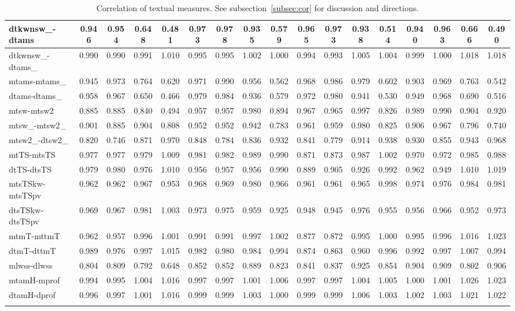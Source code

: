 \documentclass[%
 aip,
 jmp,%
 amsmath,amssymb,
 reprint,%
]{revtex4-1}
\begin{document}
\begin{longtable*}{|p{2cm}||c|c|c|c|| c|c|c|c|| c|c|c|c|| c|c|c|c|}
dtkwnsw\_-dtams & 0.946 & 0.954 & 0.648 & 0.481 & 0.973 & 0.978 & 0.935 & 0.579 & 0.965 & 0.973 & 0.938 & 0.514 & 0.940 & 0.963 & 0.666 & 0.490 \\ \hline
dtkwnsw\_-dtams\_ & 0.990 & 0.990 & 0.991 & 1.010 & 0.995 & 0.995 & 1.002 & 1.000 & 0.994 & 0.993 & 1.005 & 1.004 & 0.999 & 1.000 & 1.018 & 1.018 \\ \hline
mtams-mtams\_ & 0.945 & 0.973 & 0.764 & 0.620 & 0.971 & 0.990 & 0.956 & 0.562 & 0.968 & 0.986 & 0.979 & 0.602 & 0.903 & 0.969 & 0.763 & 0.542 \\ \hline
dtams-dtams\_ & 0.958 & 0.967 & 0.650 & 0.466 & 0.979 & 0.984 & 0.936 & 0.579 & 0.972 & 0.980 & 0.941 & 0.530 & 0.949 & 0.968 & 0.690 & 0.516 \\ \hline
mtsw-mtsw2 & 0.885 & 0.885 & 0.840 & 0.494 & 0.957 & 0.957 & 0.980 & 0.894 & 0.967 & 0.965 & 0.997 & 0.826 & 0.989 & 0.990 & 0.904 & 0.920 \\ \hline
mtsw\_-mtsw2\_ & 0.901 & 0.885 & 0.904 & 0.808 & 0.952 & 0.952 & 0.942 & 0.783 & 0.961 & 0.959 & 0.980 & 0.825 & 0.906 & 0.967 & 0.796 & 0.740 \\ \hline
mtsw2\_-dtsw2\_ & 0.820 & 0.746 & 0.871 & 0.970 & 0.848 & 0.784 & 0.836 & 0.932 & 0.841 & 0.779 & 0.914 & 0.938 & 0.930 & 0.855 & 0.943 & 0.968 \\ \hline
mtTS-mtsTS & 0.977 & 0.977 & 0.979 & 1.009 & 0.981 & 0.982 & 0.989 & 0.990 & 0.871 & 0.873 & 0.987 & 1.002 & 0.970 & 0.972 & 0.985 & 0.988 \\ \hline
dtTS-dtsTS & 0.979 & 0.980 & 0.976 & 1.010 & 0.956 & 0.957 & 0.956 & 0.990 & 0.889 & 0.905 & 0.926 & 0.992 & 0.962 & 0.949 & 1.010 & 1.019 \\ \hline
mtsTSkw-mtsTSpv & 0.962 & 0.962 & 0.967 & 0.953 & 0.968 & 0.969 & 0.980 & 0.966 & 0.961 & 0.961 & 0.965 & 0.998 & 0.974 & 0.976 & 0.984 & 0.981 \\ \hline
dtsTSkw-dtsTSpv & 0.969 & 0.967 & 0.981 & 1.003 & 0.973 & 0.975 & 0.959 & 0.925 & 0.948 & 0.945 & 0.976 & 0.955 & 0.956 & 0.966 & 0.952 & 0.973 \\ \hline
mtmT-mttmT & 0.962 & 0.957 & 0.996 & 1.001 & 0.991 & 0.991 & 0.997 & 1.002 & 0.877 & 0.872 & 0.995 & 1.000 & 0.995 & 0.996 & 1.016 & 1.023 \\ \hline
dtmT-dttmT & 0.989 & 0.976 & 0.997 & 1.015 & 0.982 & 0.980 & 0.984 & 0.994 & 0.874 & 0.863 & 0.960 & 0.996 & 0.992 & 0.997 & 1.007 & 0.994 \\ \hline
mlwss-dlwss & 0.804 & 0.809 & 0.792 & 0.648 & 0.852 & 0.852 & 0.889 & 0.823 & 0.841 & 0.837 & 0.925 & 0.854 & 0.904 & 0.909 & 0.802 & 0.906 \\ \hline
mtamH-mprof & 0.994 & 0.995 & 1.004 & 1.016 & 0.997 & 0.997 & 1.001 & 1.006 & 0.997 & 0.997 & 1.004 & 1.005 & 1.000 & 1.001 & 1.026 & 1.023 \\ \hline
dtamH-dprof & 0.996 & 0.997 & 1.001 & 1.016 & 0.999 & 0.999 & 1.003 & 1.000 & 0.999 & 0.999 & 1.006 & 1.003 & 1.002 & 1.003 & 1.021 & 1.022 \\ \hline
  \caption{Correlation of textual measures. See subsection~\ref{subsec:cor} for discussion and directions.}\label{tab:corTex}
\end{longtable*}
\end{document}
